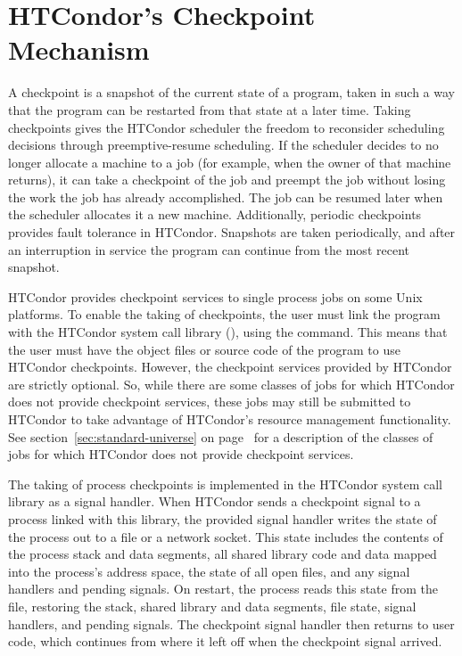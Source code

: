 \section{HTCondor's Checkpoint Mechanism}\label{ckpt-reference}

A checkpoint is a snapshot of the current state of a program,
taken in such a way that the program can be restarted from that state at a
later time.  
Taking checkpoints gives the HTCondor scheduler the freedom to
reconsider scheduling decisions through preemptive-resume scheduling.
If the scheduler decides to no longer allocate a machine to a job (for
example, when the owner of that machine returns), it can take a checkpoint
of the job and preempt the job without losing the work the job has already
accomplished.  
The job can be resumed later when the scheduler allocates it a new machine.
Additionally, periodic checkpoints provides fault tolerance in HTCondor.  
Snapshots are taken periodically,
and after an interruption in service the program can continue from the
most recent snapshot.

HTCondor provides checkpoint services to single process jobs on some
Unix platforms.
To enable the taking of checkpoints, the user must link the program with the
HTCondor system call library (), using the
 command.
This means that the
user must have the object files or source code of the program to use
HTCondor checkpoints.  
However, the checkpoint services provided by
HTCondor are strictly optional.  
So, while there are some classes of
jobs for which HTCondor does not provide checkpoint services, 
these jobs may still be submitted to HTCondor to take advantage of HTCondor's
resource management functionality.  
See section~\ref{sec:standard-universe} on
page~\pageref{sec:standard-universe} for a description of the
classes of jobs for which HTCondor does not provide checkpoint services.

The taking of process checkpoints is implemented in the HTCondor 
system call library as a signal handler.
When HTCondor sends a checkpoint signal to a
process linked with this library, the provided signal handler writes
the state of the process out to a file or a network socket.  This
state includes the contents of the process stack and data segments,
all shared library code and data mapped into the process's address
space, the state of all open files, and any signal handlers and
pending signals.  On restart, the process reads this state from the
file, restoring the stack, shared library and data segments, file
state, signal handlers, and pending signals.  The checkpoint signal
handler then returns to user code, which continues from where it left
off when the checkpoint signal arrived.

